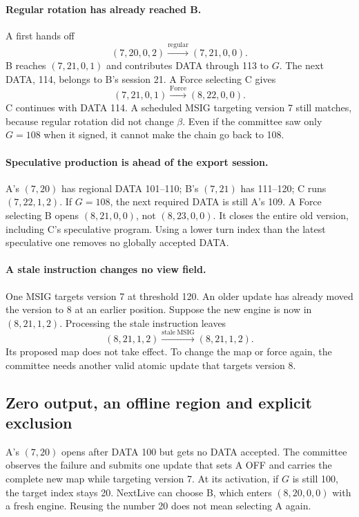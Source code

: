 \documentclass[11pt,a4paper]{article}
\begin{document}
\paragraph{Regular rotation has already reached B.}
A first hands off
\[
 (7,20,0,2)\xrightarrow{\mathrm{regular}}(7,21,0,0).
\]
B reaches $(7,21,0,1)$ and contributes DATA through 113 to $G$. The next
DATA, 114, belongs to B's session 21. A Force selecting C gives
\[
 (7,21,0,1)\xrightarrow{\mathrm{Force}}(8,22,0,0).
\]
C continues with DATA 114. A scheduled MSIG targeting version 7 still
matches, because regular rotation did not change $\beta$. Even if the
committee saw only $G=108$ when it signed, it cannot make the chain go
back to 108.

\paragraph{Speculative production is ahead of the export session.}
A's $(7,20)$ has regional DATA 101--110; B's $(7,21)$ has 111--120; C runs
$(7,22,1,2)$. If $G=108$, the next required DATA is still A's 109. A Force
selecting B opens $(8,21,0,0)$, not $(8,23,0,0)$. It closes the entire old
version, including C's speculative program. Using a lower turn index than
the latest speculative one removes no globally accepted DATA.

\paragraph{A stale instruction changes no view field.}
One MSIG targets version 7 at threshold 120. An older update has already
moved the version to 8 at an earlier position. Suppose the new
engine is now in $(8,21,1,2)$. Processing the stale instruction leaves
\[
 (8,21,1,2)\xrightarrow{\mathrm{stale\ MSIG}}(8,21,1,2).
\]
Its proposed map does not take effect. To change the map or force again,
the committee needs another valid atomic update that targets version 8.

\subsection{Zero output, an offline region and explicit exclusion}
\label{sec:retry-example}
A's $(7,20)$ opens after DATA 100 but gets no DATA accepted. The committee
observes the failure and submits one update that sets A OFF and carries
the complete new map while targeting version 7. At its activation, if
$G$ is still 100, the target index stays 20. NextLive can choose B, which
enters $(8,20,0,0)$ with a fresh engine. Reusing the number 20 does not
mean selecting A again.
\end{document}
